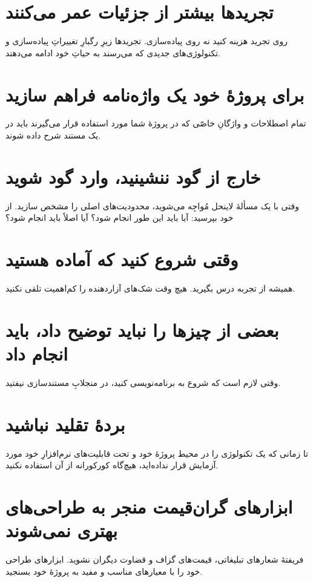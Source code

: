 \documentclass[10pt, a4paper]{book}
\begin{document}
    \section{تجریدها بیشتر از جزئیات عمر می‌کنند}
    روی تجرید هزینه کنید نه روی پیاده‌سازی. تجریدها زیرِ رگبارِ تغییراتِ پیاده‌سازی و تکنولوژی‌های جدیدی که می‌رسند به حیاتِ خود ادامه می‌دهند.

    \section{برای پروژهٔ خود یک واژه‌نامه فراهم سازید}
    تمام اصطلاحات و واژگانِ خاصّی که در پروژهٔ شما مورد استفاده قرار می‌گیرند باید در یک مستند شرح داده شوند.

    \section{خارج از گود ننشینید، وارد گود شوید}
    وقتی با یک مسألهٔ لاینحل مُواجِه می‌شوید، محدودیت‌های اصلی را مشخص سازید. از خود بپرسید: آیا باید این طور انجام شود؟ آیا اصلاً باید انجام شود؟
    
    \section{وقتی شروع کنید که آماده هستید}
    همیشه از تجربه درس بگیرید. هیچ وقت شک‌های آزاردهنده را کم‌اهمیت تلقی نکنید.

    \section{بعضی از چیزها را نباید توضیح داد، باید انجام داد}
    وقتی لازم است که شروع به برنامه‌نویسی کنید، در منجلابِ مستندسازی نیفتید.

    \section{بردهٔ تقلید نباشید}
    تا زمانی که یک تکنولوژی را در محیط پروژهٔ خود و تحت قابلیت‌های نرم‌افزارِ خود مورد آزمایش قرار نداده‌اید، هیچ‌گاه کورکورانه از آن استفاده نکنید.
    
    \section{ابزارهای گران‌قیمت منجر به طراحی‌های بهتری نمی‌شوند}
    فریفتهٔ شعارهای تبلیغاتی، قیمت‌های گزاف و قضاوت دیگران نشوید. ابزارهای طراحی خود را با معیارهای مناسب و مفید به پروژهٔ خود بسنجید.
    
\end{document}
